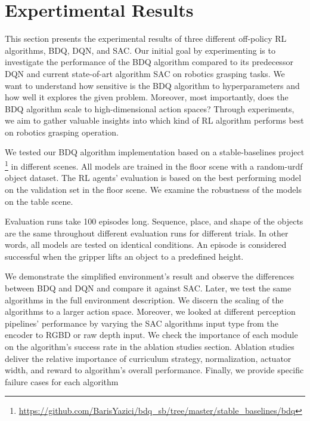 
\chapter{Expertimental Results}\label{chapter:evaluation}

This section presents the experimental results of three different off-policy RL algorithms, BDQ, DQN, and SAC. Our initial goal by experimenting is to investigate the performance of the BDQ algorithm compared to its predecessor DQN and current state-of-art algorithm SAC on robotics grasping tasks. We want to understand how sensitive is the BDQ algorithm to hyperparameters and how well it explores the given problem. Moreover, most importantly, does the BDQ algorithm scale to high-dimensional action spaces? Through experiments, we aim to gather valuable insights into which kind of RL algorithm performs best on robotics grasping operation.

We tested our BDQ algorithm implementation based on a stable-baselines project \footnote{\url{https://github.com/BarisYazici/bdq_sb/tree/master/stable_baselines/bdq}} in different scenes. All models are trained in the floor scene with a random-urdf object dataset. The RL agents' evaluation is based on the best performing model on the validation set in the floor scene. We examine the robustness of the models on the table scene.

Evaluation runs take 100 episodes long. Sequence, place, and shape of the objects are the same throughout different evaluation runs for different trials. In other words, all models are tested on identical conditions. An episode is considered successful when the gripper lifts an object to a predefined height.

We demonstrate the simplified environment's result and observe the differences between BDQ and DQN and compare it against SAC. Later, we test the same algorithms in the full environment description. We discern the scaling of the algorithms to a larger action space. Moreover, we looked at different perception pipelines' performance by varying the SAC algorithms input type from the encoder to RGBD or raw depth input. We check the importance of each module on the algorithm's success rate in the ablation studies section.  Ablation studies deliver the relative importance of curriculum strategy, normalization, actuator width, and reward to algorithm's overall performance. Finally, we provide specific failure cases for each algorithm


